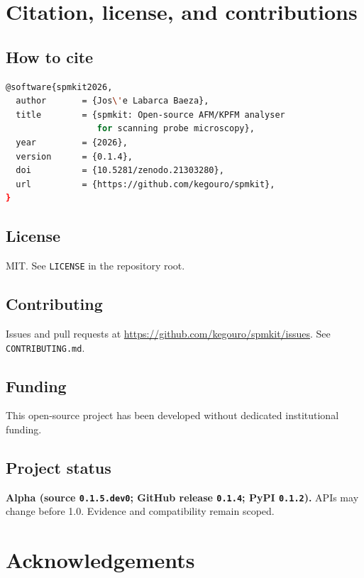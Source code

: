 \documentclass[a4paper,11pt]{article}
\begin{document}
\section{Citation, license, and contributions}

\subsection{How to cite}

\begin{lstlisting}[language=bash]
@software{spmkit2026,
  author       = {Jos\'e Labarca Baeza},
  title        = {spmkit: Open-source AFM/KPFM analyser
                  for scanning probe microscopy},
  year         = {2026},
  version      = {0.1.4},
  doi          = {10.5281/zenodo.21303280},
  url          = {https://github.com/kegouro/spmkit},
}
\end{lstlisting}

\subsection{License}
MIT. See \texttt{LICENSE} in the repository root.

\subsection{Contributing}
Issues and pull requests at \url{https://github.com/kegouro/spmkit/issues}.
See \texttt{CONTRIBUTING.md}.

\subsection{Funding}
This open-source project has been developed without dedicated institutional funding.

\subsection{Project status}
\textbf{Alpha (source \texttt{0.1.5.dev0}; GitHub release \texttt{0.1.4}; PyPI
\texttt{0.1.2}).} APIs may change before 1.0. Evidence and compatibility remain scoped.

\section{Acknowledgements}
\end{document}
